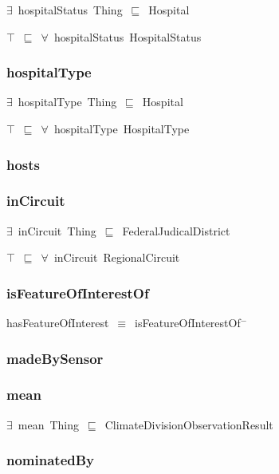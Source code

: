 \documentclass{article}
\begin{document}
\ensuremath{\exists}~hospitalStatus~Thing~\ensuremath{\sqsubseteq}~Hospital

\ensuremath{\top}~\ensuremath{\sqsubseteq}~\ensuremath{\forall}~hospitalStatus~HospitalStatus

\subsubsection*{hospitalType}

\ensuremath{\exists}~hospitalType~Thing~\ensuremath{\sqsubseteq}~Hospital

\ensuremath{\top}~\ensuremath{\sqsubseteq}~\ensuremath{\forall}~hospitalType~HospitalType

\subsubsection*{hosts}

\subsubsection*{inCircuit}

\ensuremath{\exists}~inCircuit~Thing~\ensuremath{\sqsubseteq}~FederalJudicalDistrict

\ensuremath{\top}~\ensuremath{\sqsubseteq}~\ensuremath{\forall}~inCircuit~RegionalCircuit

\subsubsection*{isFeatureOfInterestOf}

hasFeatureOfInterest~\ensuremath{\equiv}~isFeatureOfInterestOf\ensuremath{^-}

\subsubsection*{madeBySensor}

\subsubsection*{mean}

\ensuremath{\exists}~mean~Thing~\ensuremath{\sqsubseteq}~ClimateDivisionObservationResult

\subsubsection*{nominatedBy}
\end{document}
